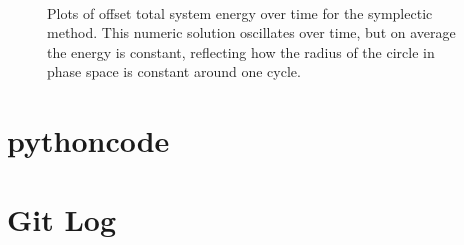 \documentclass[a4paper, 11pt]{article}
\begin{document}
 \begin{figure}[H]
\\ 
\caption{Plots of offset total system energy over time for the symplectic method. This numeric solution oscillates over time, but on average the energy is constant, reflecting how the radius of the circle in phase space is constant around one cycle.}
\end{figure}

\section{pythoncode}


\section{Git Log}

\end{document}
